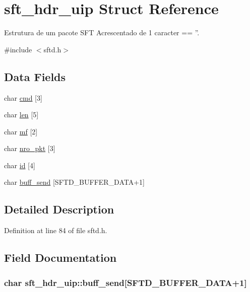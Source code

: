 \hypertarget{structsft__hdr__uip}{
\section{sft\_\-hdr\_\-uip Struct Reference}
\label{structsft__hdr__uip}
}


Estrutura de um pacote SFT Acrescentado de 1 caracter == ''.  




{\ttfamily \#include $<$sftd.h$>$}

\subsection*{Data Fields}
\begin{DoxyCompactItemize}
\item 
char \hyperlink{structsft__hdr__uip_a2524d78df43082cbce489e0a78044285}{cmd} \mbox{[}3\mbox{]}
\item 
char \hyperlink{structsft__hdr__uip_aa97a931508c8f23b3dc8a00723ee9a75}{len} \mbox{[}5\mbox{]}
\item 
char \hyperlink{structsft__hdr__uip_afb2145a0a7cc70591facbf8ae04335be}{mf} \mbox{[}2\mbox{]}
\item 
char \hyperlink{structsft__hdr__uip_accc142816cf549a0c5806864038bd585}{nro\_\-pkt} \mbox{[}3\mbox{]}
\item 
char \hyperlink{structsft__hdr__uip_a2d2b5f84a84e81873f22044d271e7898}{id} \mbox{[}4\mbox{]}
\item 
char \hyperlink{structsft__hdr__uip_a1d69600702789f4cd1fc0ec907fe9f4c}{buff\_\-send} \mbox{[}SFTD\_\-BUFFER\_\-DATA+1\mbox{]}
\end{DoxyCompactItemize}


\subsection{Detailed Description}


Definition at line 84 of file sftd.h.



\subsection{Field Documentation}
\hypertarget{structsft__hdr__uip_a1d69600702789f4cd1fc0ec907fe9f4c}{
\subsubsection[{buff\_\-send}]{\setlength{\rightskip}{0pt plus 5cm}char {\bf sft\_\-hdr\_\-uip::buff\_\-send}\mbox{[}SFTD\_\-BUFFER\_\-DATA+1\mbox{]}}}
\label{structsft__hdr__uip_a1d69600702789f4cd1fc0ec907fe9f4c}


